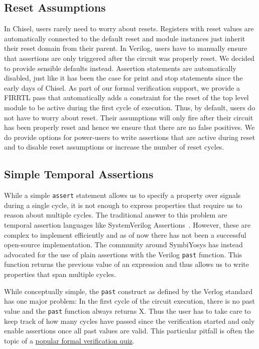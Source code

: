 \documentclass[conference]{IEEEtran}
\newcommand{\code}[1]{{\small{\texttt{#1}}}}
\begin{document}
\subsection{Reset Assumptions}\label{sec:reset}

In Chisel, users rarely need to worry about resets.
Registers with reset values are automatically connected to the default reset %
and module instances just inherit their reset domain from their parent.
In Verilog, users have to manually ensure that assertions are only triggered after the circuit was properly reset.
We decided to provide sensible defaults instead.
Assertion statements are automatically disabled, just like it has been the case for print and stop statements
since the early days of Chisel.
As part of our formal verification support, we provide a FIRRTL pass
that automatically adds a constraint for the reset of the top level module to be active during the first cycle of execution.
Thus, by default, users do not have to worry about reset. Their assumptions will only fire
after their circuit has been properly reset and hence we ensure that there are no false positives.
We do provide options for power-users to write assertions that are active during reset and to
disable reset assumptions or increase the number of reset cycles.


\subsection{Simple Temporal Assertions}\label{sec:past}


While a simple \code{assert} statement allows us to specify a property over signals during a single
cycle, it is not enough to express properties that require us to reason about multiple cycles.
The traditional answer to this problem are temporal assertion languages like SystemVerilog Assertions~\cite{SystemVerilog}.
However, these are complex to implement efficiently and as of now there has not been a successful open-source implementation.
The community around SymbiYosys has instead advocated for the use of plain assertions with the Verilog \code{past}
function. This function returns the previous value of an expression and thus allows us to write properties that span multiple cycles.

While conceptually simple, the \code{past} construct as defined by the Verlog standard has one major problem:
In the first cycle of the circuit execution, there is no past value and the \code{past} function always returns X.
Thus the user has to take care to keep track of how many cycles have passed since the verification started and only enable assertions
once all past values are valid.
This particular pitfall is often the topic of a \href{http://zipcpu.com/quiz/2019/11/16/quiz07.html}{popular formal verification quiz}.
\end{document}
